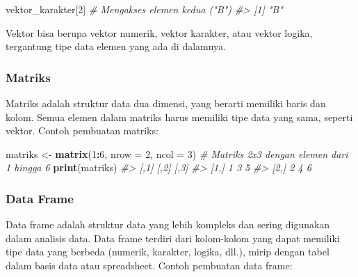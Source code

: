 \documentclass[
  oneside]{book}
\newenvironment{Shaded}{\begin{snugshade}}{\end{snugshade}}
\newcommand{\AttributeTok}[1]{\textcolor[rgb]{0.13,0.29,0.53}{#1}}
\newcommand{\CommentTok}[1]{\textcolor[rgb]{0.56,0.35,0.01}{\textit{#1}}}
\newcommand{\DecValTok}[1]{\textcolor[rgb]{0.00,0.00,0.81}{#1}}
\newcommand{\FunctionTok}[1]{\textcolor[rgb]{0.13,0.29,0.53}{\textbf{#1}}}
\newcommand{\NormalTok}[1]{#1}
\newcommand{\OtherTok}[1]{\textcolor[rgb]{0.56,0.35,0.01}{#1}}
\newcommand{\SpecialCharTok}[1]{\textcolor[rgb]{0.81,0.36,0.00}{\textbf{#1}}}
\begin{document}
\begin{Shaded}
\begin{Highlighting}[]
\NormalTok{vektor\_karakter[}\DecValTok{2}\NormalTok{] }\CommentTok{\# Mengakses elemen kedua ("B")}
\CommentTok{\#\textgreater{} [1] "B"}
\end{Highlighting}
\end{Shaded}

Vektor bisa berupa vektor numerik, vektor karakter, atau vektor logika,
tergantung tipe data elemen yang ada di dalamnya.

\subsubsection*{Matriks}\label{matriks}

Matriks adalah struktur data dua dimensi, yang berarti memiliki baris dan kolom. Semua elemen dalam matriks harus memiliki tipe data yang sama, seperti vektor. Contoh pembuatan matriks:

\begin{Shaded}
\begin{Highlighting}[]
\NormalTok{matriks }\OtherTok{\textless{}{-}} \FunctionTok{matrix}\NormalTok{(}\DecValTok{1}\SpecialCharTok{:}\DecValTok{6}\NormalTok{, }\AttributeTok{nrow =} \DecValTok{2}\NormalTok{, }\AttributeTok{ncol =} \DecValTok{3}\NormalTok{)  }\CommentTok{\# Matriks 2x3 dengan elemen dari 1 hingga 6}
\FunctionTok{print}\NormalTok{(matriks)}
\CommentTok{\#\textgreater{}      [,1] [,2] [,3]}
\CommentTok{\#\textgreater{} [1,]    1    3    5}
\CommentTok{\#\textgreater{} [2,]    2    4    6}
\end{Highlighting}
\end{Shaded}

\subsubsection*{Data Frame}\label{data-frame}

Data frame adalah struktur data yang lebih kompleks dan sering digunakan dalam analisis data. Data frame terdiri dari kolom-kolom yang dapat memiliki tipe data yang berbeda (numerik, karakter, logika, dll.), mirip dengan tabel dalam basis data atau spreadsheet. Contoh pembuatan data frame:
\end{document}
